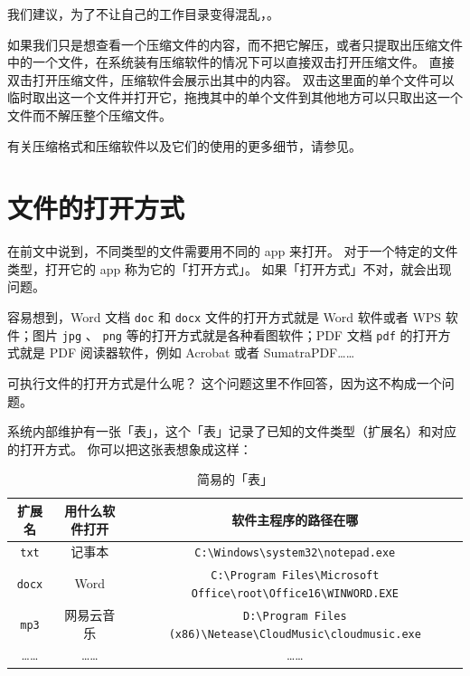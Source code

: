 我们建议，为了不让自己的工作目录变得混乱，。

如果我们只是想查看一个压缩文件的内容，而不把它解压，或者只提取出压缩文件中的一个文件，在系统装有压缩软件的情况下可以直接双击打开压缩文件。
直接双击打开压缩文件，压缩软件会展示出其中的内容。
双击这里面的单个文件可以临时取出这一个文件并打开它，拖拽其中的单个文件到其他地方可以只取出这一个文件而不解压整个压缩文件。

有关压缩格式和压缩软件以及它们的使用的更多细节，请参见。

\section{文件的打开方式}

在前文中说到，不同类型的文件需要用不同的 app 来打开。
对于一个特定的文件类型，打开它的 app 称为它的「打开方式」。
如果「打开方式」不对，就会出现问题。

容易想到，Word 文档 \verb|doc| 和 \verb|docx| 文件的打开方式就是 Word 软件或者 WPS 软件；图片 \verb|jpg| 、 \verb|png| 等的打开方式就是各种看图软件；PDF 文档 \verb|pdf| 的打开方式就是 PDF 阅读器软件，例如 Acrobat 或者 SumatraPDF……

\begin{note}
  可执行文件的打开方式是什么呢？
  这个问题这里不作回答，因为这不构成一个问题。
\end{note}

系统内部维护有一张「表」，这个「表」记录了已知的文件类型（扩展名）和对应的打开方式。
你可以把这张表想象成这样：

\begin{table}[htbp]
  \centering\begin{tabular}{*{3}{>{\small}c}}
    \toprule
    扩展名 & 用什么软件打开 & 软件主程序的路径在哪 \\\midrule
     \verb|txt|   & 记事本 &  \verb|C:\Windows\system32\notepad.exe|  \\
     \verb|docx|  & Word &  \verb|C:\Program Files\Microsoft Office\root\Office16\WINWORD.EXE|  \\
     \verb|mp3|  & 网易云音乐 &  \verb|D:\Program Files (x86)\Netease\CloudMusic\cloudmusic.exe|  \\
    …… & …… & …… \\\bottomrule
  \end{tabular}
  \caption{简易的「表」}
  \label{regtable}
\end{table}


